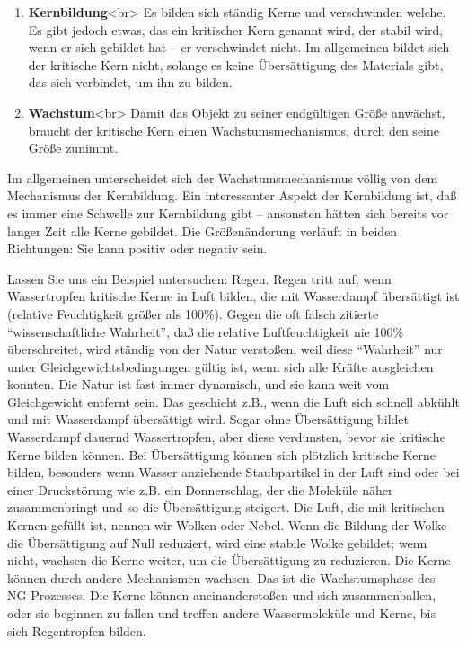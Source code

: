 \begin{enumerate}[label={\arabic*.}] 
\item \textbf{Kernbildung}<br>
Es bilden sich ständig Kerne und verschwinden welche.
Es gibt jedoch etwas, das ein kritischer Kern genannt wird, der stabil wird, wenn er sich gebildet hat -- er verschwindet nicht.
Im allgemeinen bildet sich der kritische Kern nicht, solange es keine Übersättigung des Materials gibt, das sich verbindet, um ihn zu bilden.

\item \textbf{Wachstum}<br>
Damit das Objekt zu seiner endgültigen Größe anwächst, braucht der kritische Kern einen Wachstumsmechanismus, durch den seine Größe zunimmt.


 \end{enumerate}
Im allgemeinen unterscheidet sich der Wachstumsmechanismus völlig von dem Mechanismus der Kernbildung.
Ein interessanter Aspekt der Kernbildung ist, daß es immer eine Schwelle zur Kernbildung gibt -- ansonsten hätten sich bereits vor langer Zeit alle Kerne gebildet.
Die Größenänderung verläuft in beiden Richtungen: Sie kann positiv oder negativ sein.

Lassen Sie uns ein Beispiel untersuchen: Regen.
Regen tritt auf, wenn Wassertropfen kritische Kerne in Luft bilden, die mit Wasserdampf übersättigt ist (relative Feuchtigkeit größer als 100\%).
Gegen die oft falsch zitierte \enquote{wissenschaftliche Wahrheit}, daß die relative Luftfeuchtigkeit nie 100\% überschreitet, wird ständig von der Natur verstoßen, weil diese \enquote{Wahrheit} nur unter Gleichgewichtsbedingungen gültig ist, wenn sich alle Kräfte ausgleichen konnten.
Die Natur ist fast immer dynamisch, und sie kann weit vom Gleichgewicht entfernt sein.
Das geschieht z.B., wenn die Luft sich schnell abkühlt und mit Wasserdampf übersättigt wird.
Sogar ohne Übersättigung bildet Wasserdampf dauernd Wassertropfen, aber diese verdunsten, bevor sie kritische Kerne bilden können.
Bei Übersättigung können sich plötzlich kritische Kerne bilden, besonders wenn Wasser anziehende Staubpartikel in der Luft sind oder bei einer Druckstörung wie z.B. ein Donnerschlag, der die Moleküle näher zusammenbringt und so die Übersättigung steigert.
Die Luft, die mit kritischen Kernen gefüllt ist, nennen wir Wolken oder Nebel.
Wenn die Bildung der Wolke die Übersättigung auf Null reduziert, wird eine stabile Wolke gebildet; wenn nicht, wachsen die Kerne weiter, um die Übersättigung zu reduzieren.
Die Kerne können durch andere Mechanismen wachsen.
Das ist die Wachstumsphase des NG-Prozesses.
Die Kerne können aneinanderstoßen und sich zusammenballen, oder sie beginnen zu fallen und treffen andere Wassermoleküle und Kerne, bis sich Regentropfen bilden.

